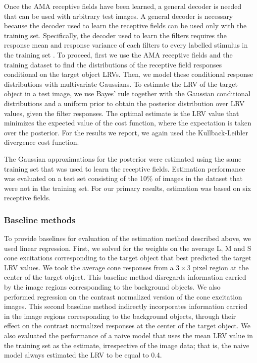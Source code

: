 \documentclass{jov}
\begin{document}
Once the AMA receptive fields have been learned, a general decoder is needed that can be used with arbitrary test images.
A general decoder is necessary because the decoder used to learn the receptive fields can be used only with the training set. Specifically, the decoder used to learn the filters requires the response mean and response variance of each filters to every labelled stimulus in the training set \cite{geisler2009optimal,burge2017accuracy}.
To proceed, first we use the AMA receptive fields and the training dataset to find the distributions of the receptive field responses conditional on the target object LRVs.
Then, we model these conditional response distributions with multivariate Gaussians.
To estimate the LRV of the target object in a test image, we use Bayes' rule together with the Gaussian conditional distributions and a uniform prior to obtain the posterior distribution over LRV values, given the filter responses.
The optimal estimate is the LRV value that minimizes the expected value of the cost function, where the expectation is taken over the posterior.
For the results we report, we again used the Kullback-Leibler divergence cost function.

The Gaussian approximations for the posterior were estimated using the same training set that was used to learn the receptive fields.
Estimation performance was evaluated on a test set consisting of the 10\% of images in the dataset that were not in the training set.
For our primary results, estimation was based on six receptive fields.

\subsubsection*{Baseline methods}
To provide baselines for evaluation of the estimation method described above, we used linear regression.
First, we solved for the weights on the average L, M and S cone excitations corresponding to the target object that best predicted the target LRV values.
We took the average cone responses from a $3 \times 3$ pixel region at the center of the target object.
This baseline method disregards information carried by the image regions corresponding to the background objects.
We also performed regression on the contrast normalized version of the cone excitation images.
This second baseline method indirectly incorporates information carried in the image regions corresponding to the background objects,
through their effect on the contrast normalized responses at the center of the target object. 
We also evaluated the performance of a naive model that uses the mean LRV value in the training set as the estimate, irrespective
of the image data; that is, the naive model always estimated the LRV to be equal to 0.4.
\end{document}
